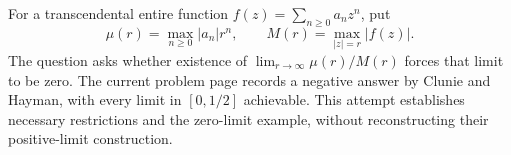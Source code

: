 For a transcendental entire function $f(z)=\sum_{n\ge0}a_nz^n$, put
\[
 \mu(r)=\max_{n\ge0}|a_n|r^n,\qquad
 M(r)=\max_{|z|=r}|f(z)|.
\]
The question asks whether existence of $\lim_{r\to\infty}\mu(r)/M(r)$ forces that limit to be zero. The current problem page records a negative answer by Clunie and Hayman, with every limit in $[0,1/2]$ achievable. This attempt establishes necessary restrictions and the zero-limit example, without reconstructing their positive-limit construction.
